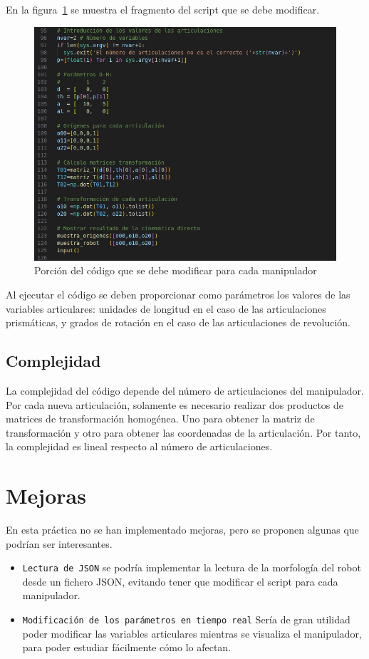 En la figura~\ref{chapter:intro2} se muestra el fragmento del script que se debe modificar.
\begin{figure}[htb]
   \centering
   \includegraphics[width=1\linewidth]{images/cin_dir_1.png}
   \caption{Porción del código que se debe modificar para cada manipulador}
   \label{chapter:intro2}
\end{figure}

\bigskip Al ejecutar el código se deben proporcionar como parámetros los valores de las variables articulares: unidades de longitud en el caso de las articulaciones prismáticas, y grados de rotación en el caso de las articulaciones de revolución. 

\subsection{Complejidad}
La complejidad del código depende del número de articulaciones del manipulador. Por cada nueva articulación, solamente es necesario realizar dos productos de matrices de transformación homogénea. Uno para obtener la matriz de transformación y otro para obtener las coordenadas de la articulación. Por tanto, la complejidad es lineal respecto al número de articulaciones.
\section{Mejoras}
En esta práctica no se han implementado mejoras, pero se proponen algunas que podrían ser interesantes.
\begin{itemize}
   \item \texttt{Lectura de JSON} se podría implementar la lectura de la morfología del robot desde un fichero JSON, evitando tener que modificar el script para cada manipulador.
   \item \texttt{Modificación de los parámetros en tiempo real} Sería de gran utilidad poder modificar las variables articulares mientras se visualiza el manipulador, para poder estudiar fácilmente cómo lo afectan.
\end{itemize}

